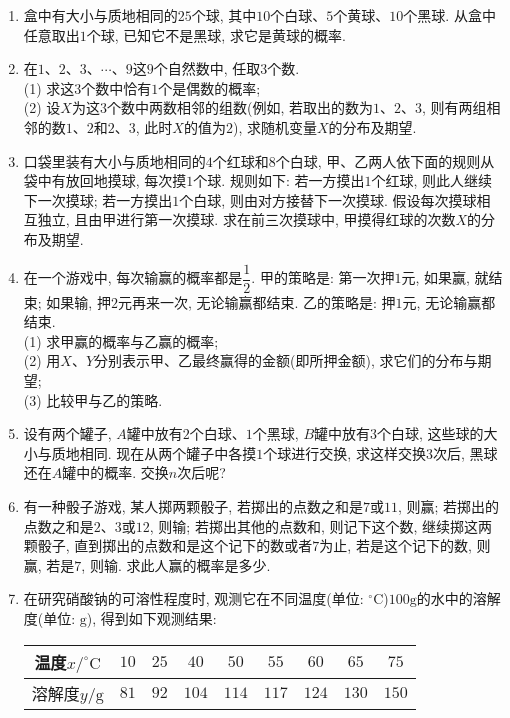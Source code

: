 \documentclass[10pt,a4paper]{article}
\begin{document}
\begin{enumerate}[1.]
\item 盒中有大小与质地相同的$25$个球, 其中$10$个白球、$5$个黄球、$10$个黑球. 从盒中任意取出$1$个球, 已知它不是黑球, 求它是黄球的概率.
\item 在$1$、$2$、$3$、$\cdots$、$9$这$9$个自然数中, 任取$3$个数.\\
(1) 求这$3$个数中恰有$1$个是偶数的概率;\\
(2) 设$X$为这$3$个数中两数相邻的组数(例如, 若取出的数为$1$、$2$、$3$, 则有两组相邻的数$1$、$2$和$2$、$3$, 此时$X$的值为$2$), 求随机变量$X$的分布及期望.
\item 口袋里装有大小与质地相同的$4$个红球和$8$个白球, 甲、乙两人依下面的规则从袋中有放回地摸球, 每次摸$1$个球. 规则如下: 若一方摸出$1$个红球, 则此人继续下一次摸球; 若一方摸出$1$个白球, 则由对方接替下一次摸球. 假设每次摸球相互独立, 且由甲进行第一次摸球. 求在前三次摸球中, 甲摸得红球的次数$X$的分布及期望.
\item 在一个游戏中, 每次输赢的概率都是$\dfrac 12$. 甲的策略是: 第一次押$1$元, 如果赢, 就结束; 如果输, 押$2$元再来一次, 无论输赢都结束. 乙的策略是: 押$1$元, 无论输赢都结束.\\
(1) 求甲赢的概率与乙赢的概率;\\
(2) 用$X$、$Y$分别表示甲、乙最终赢得的金额(即所押金额), 求它们的分布与期望;\\
(3) 比较甲与乙的策略.
\item 设有两个罐子, $A$罐中放有$2$个白球、$1$个黑球, $B$罐中放有$3$个白球, 这些球的大小与质地相同. 现在从两个罐子中各摸$1$个球进行交换, 求这样交换$3$次后, 黑球还在$A$罐中的概率. 交换$n$次后呢?
\item 有一种骰子游戏, 某人掷两颗骰子, 若掷出的点数之和是$7$或$11$, 则赢; 若掷出的点数之和是$2$、$3$或$12$, 则输; 若掷出其他的点数和, 则记下这个数, 继续掷这两颗骰子, 直到掷出的点数和是这个记下的数或者$7$为止, 若是这个记下的数, 则赢, 若是$7$, 则输. 求此人赢的概率是多少.
\item 在研究硝酸钠的可溶性程度时, 观测它在不同温度(单位: $^\circ\text{C}$)$100\text{g}$的水中的溶解度(单位: $\text{g}$), 得到如下观测结果:
\begin{center}
    \begin{tabular}{|c|c|c|c|c|c|c|c|c|}
        \hline
        温度$x/^\circ\text{C}$ & $10$ & $25$ & $40$ & $50$ & $55$ & $60$ & $65$ & $75$ \\ \hline
        溶解度$y/\text{g}$ & $81$ & $92$ & $104$ & $114$ & $117$ & $124$ & $130$ & $150$ \\ \hline
    \end{tabular}
\end{center}

\end{enumerate}
\end{document}
